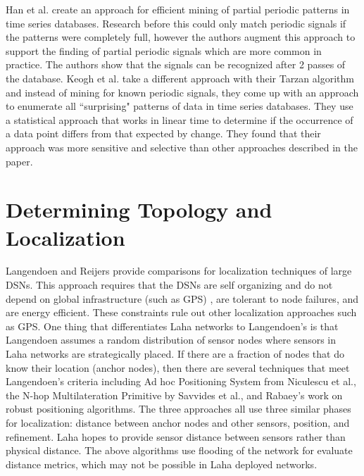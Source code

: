 Han et al.\cite{han1999efficient} create an approach for efficient mining of partial periodic patterns in time series databases. Research before this could only match periodic signals if the patterns were completely full, however the authors augment this approach to support the finding of partial periodic signals which are more common in practice. The authors show that the signals can be recognized after 2 passes of the database. Keogh et al.\cite{keogh2002finding} take a different approach with their Tarzan algorithm and instead of mining for known periodic signals, they come up with an approach to enumerate all ``surprising" patterns of data in time series databases. They use a statistical approach that works in linear time to determine if the occurrence of a data point differs from that expected by change. They found that their approach was more sensitive and selective than other approaches described in the paper.

\section{Determining Topology and Localization}\label{sec:determining-topology-and-localization}
Langendoen and Reijers\cite{langendoen2003distributed} provide comparisons for localization techniques of large DSNs. This approach requires that the DSNs are self organizing and do not depend on global infrastructure (such as GPS) , are tolerant to node failures, and are energy efficient. These constraints rule out other localization approaches such as GPS. One thing that differentiates Laha networks to Langendoen's is that Langendoen assumes a random distribution of sensor nodes where sensors in Laha networks are strategically placed. If there are a fraction of nodes that do know their location (anchor nodes), then there are several techniques that meet Langendoen's criteria including Ad hoc Positioning System from Niculescu et al.\cite{niculescu2003ad}, the N-hop Multilateration Primitive by Savvides et al.\cite{savvides2002bits}, and Rabaey's work on robust positioning algorithms\cite{rabaey2002robust}. The three approaches all use three similar phases for localization: distance between anchor nodes and other sensors, position, and refinement. Laha hopes to provide sensor distance between sensors rather than physical distance. The above algorithms use flooding of the network for evaluate distance metrics, which may not be possible in Laha deployed networks.

